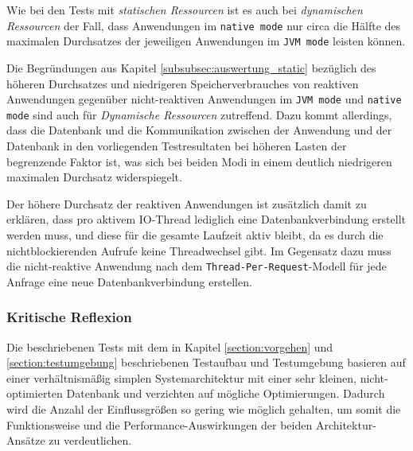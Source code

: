 Wie bei den Tests mit \textit{statischen Ressourcen} ist es auch bei \textit{dynamischen Ressourcen} der Fall, dass Anwendungen im
\verb|native mode| nur circa die Hälfte des maximalen Durchsatzes der jeweiligen Anwendungen im \verb|JVM mode| leisten können.

Die Begründungen aus Kapitel \ref{subsubsec:auswertung_static} bezüglich des höheren Durchsatzes und niedrigeren Speicherverbrauches
von reaktiven Anwendungen gegenüber nicht-reaktiven Anwendungen im \verb|JVM mode| und \verb|native mode| sind auch für
\textit{Dynamische Ressourcen} zutreffend.
Dazu kommt allerdings, dass die Datenbank und die Kommunikation zwischen der Anwendung und der Datenbank in den vorliegenden Testresultaten
bei höheren Lasten der begrenzende Faktor ist, was sich bei beiden Modi in einem deutlich niedrigeren maximalen Durchsatz widerspiegelt.

Der höhere Durchsatz der reaktiven Anwendungen ist zusätzlich damit zu erklären, dass pro aktivem IO-Thread lediglich eine
Datenbankverbindung erstellt werden muss, und diese für die gesamte Laufzeit aktiv bleibt, da es durch die nichtblockierenden
Aufrufe keine Threadwechsel gibt. Im Gegensatz dazu muss die nicht-reaktive Anwendung nach dem \verb|Thread-Per-Request|-Modell
für jede Anfrage eine neue Datenbankverbindung erstellen.
\newpage

\subsubsection{Kritische Reflexion}
\label{subsubsec:auswertung_kritische_reflexion}
Die beschriebenen Tests mit dem in Kapitel \ref{section:vorgehen} und \ref{section:testumgebung} beschriebenen Testaufbau und Testumgebung
basieren auf einer verhältnismäßig simplen Systemarchitektur mit einer sehr kleinen, nicht-optimierten Datenbank und verzichten auf mögliche Optimierungen.
Dadurch wird die Anzahl der Einflussgrößen so gering wie möglich gehalten, um somit die Funktionsweise und die
Performance-Auswirkungen der beiden Architektur-Ansätze zu verdeutlichen.

